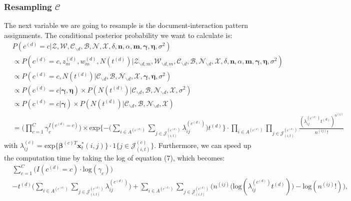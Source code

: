 \documentclass[a4paper]{article}
\begin{document}
  \subsubsection{Resampling $\mathcal{C}$}
  The next variable we are going to resample is the document-interaction pattern assignments. The conditional posterior probability we want to calculate is:
  \begin{equation}
  \begin{aligned} & P(c^{(d)}=c|\mathcal{Z}, \mathcal{W}, \mathcal{C}_{\backslash d}, \mathcal{B}, \mathcal{N}, \mathcal{X}, \delta, \boldsymbol{n}, \alpha, \boldsymbol{m}, \boldsymbol{\gamma}, \boldsymbol{\eta}, \sigma^2)\\ &\propto  P(c^{(d)}=c, z^{(d)}_m, w^{(d)}_m, N{(t^{(d)})}|\mathcal{Z}_{\backslash d, m}, \mathcal{W}_{\backslash d, m}, \mathcal{C}_{\backslash d}, \mathcal{B}, \mathcal{N}_{\backslash d}, \mathcal{X}, \delta, \boldsymbol{n}, \alpha, \boldsymbol{m}, \boldsymbol{\gamma}, \boldsymbol{\eta}, \sigma^2)\\ & \propto P(c^{(d)}=c, N{(t^{(d)})}| \mathcal{C}_{\backslash d}, \mathcal{B}, \mathcal{N}_{\backslash d}, \mathcal{X}, \boldsymbol{\gamma}, \boldsymbol{\eta}, \sigma^2) \\ & \propto P(c^{(d)}=c|\boldsymbol{\gamma}, \boldsymbol{\eta}) \times P( N{(t^{(d)})} | \mathcal{C}_{\backslash d}, \mathcal{B}, \mathcal{N}_{\backslash d}, \mathcal{X}, \sigma^2)  \\ & \propto P(c^{(d)}=c|\boldsymbol{\gamma}) \times P( N{(t^{(d)})} | \mathcal{C}_{\backslash d}, \mathcal{B}, \mathcal{N}_{\backslash d}, \mathcal{X}) \\ & =\Big(\prod_{c=1}^{C} \gamma_{c}^{I(c^{(d)}=c)}\Big)\times \mbox{exp}\Big\{{-\big(\sum\limits_{i \in A^{(c^{(d)})}}\sum\limits_{j\in \mathcal{J}^{(c^{(d)})}_{(i, t)}}\lambda_{ij}^{(c^{(d)})}\big)t^{(d)}}\Big\}\cdot \prod_{i \in A^{(c^{(d)})}}\prod_{j\in \mathcal{J}^{(c^{(d)})}_{(i, t)}}\frac{(\lambda_{ij}^{(c^{(d)})}t^{(d)})^{n^{(ij)}}}{n^{(ij)}!} 
 \end{aligned}
  \end{equation}
  	with $\lambda_{ij}^{(c)}=\mbox{exp}\Big\{\boldsymbol{\beta}^{(c)T}\boldsymbol{x}^*_t(i, j)\Big\}\cdot 1\{j \in \mathcal{J}^{(c)}_{(i, t)}\}$. Furthermore, we can speed up the computation time by taking the log of equation (7), which becomes:
  	\begin{equation}
  	\begin{aligned} 
& \sum\limits_{c=1}^{C} \Big({I(c^{(d)}=c)} \cdot\mbox{log}(\gamma_{c})\Big)\\&-t^{(d)}\big(\sum\limits_{i \in A^{(c^{(d)})}}\sum\limits_{j\in \mathcal{J}^{(c^{(d)})}_{(i, t)}}\lambda_{ij}^{(c^{(d)})}\big)+\sum_{i \in A^{(c^{(d)})}}\sum_{j\in \mathcal{J}^{(c^{(d)})}_{(i, t)}}\Big(n^{(ij)}\big(\mbox{log}(\lambda_{ij}^{(c^{(d)})}t^{(d)})\big)-\mbox{log}(n^{(ij)}!)\Big), 
  	\end{aligned}
  	\end{equation} 
\end{document}
